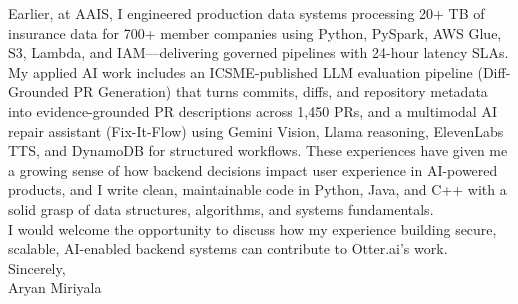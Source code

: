 \documentclass[letterpaper,11pt]{article}
\begin{document}
Earlier, at AAIS, I engineered production data systems processing 20+ TB of insurance data for 700+ member companies using Python, PySpark, AWS Glue, S3, Lambda, and IAM—delivering governed pipelines with 24-hour latency SLAs. My applied AI work includes an ICSME-published LLM evaluation pipeline (Diff-Grounded PR Generation) that turns commits, diffs, and repository metadata into evidence-grounded PR descriptions across 1,450 PRs, and a multimodal AI repair assistant (Fix-It-Flow) using Gemini Vision, Llama reasoning, ElevenLabs TTS, and DynamoDB for structured workflows. These experiences have given me a growing sense of how backend decisions impact user experience in AI-powered products, and I write clean, maintainable code in Python, Java, and C++ with a solid grasp of data structures, algorithms, and systems fundamentals.\\[8pt]

I would welcome the opportunity to discuss how my experience building secure, scalable, AI-enabled backend systems can contribute to Otter.ai's work.\\[12pt]

Sincerely,\\[8pt]

Aryan Miriyala
\end{document}
